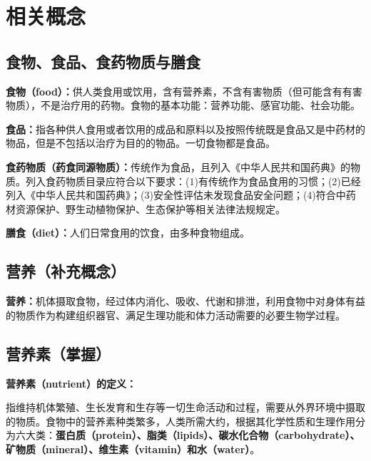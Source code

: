 \section{相关概念}

\subsection{食物、食品、食药物质与膳食}

\begin{defbox}
\textbf{食物（food）：}供人类食用或饮用，含有营养素，不含有害物质（但可能含有有害物质），不是治疗用的药物。食物的基本功能：营养功能、感官功能、社会功能。

\textbf{食品：}指各种供人食用或者饮用的成品和原料以及按照传统既是食品又是中药材的物品，但是不包括以治疗为目的的物品。一切食物都是食品。

\textbf{食药物质（药食同源物质）：}传统作为食品，且列入《中华人民共和国药典》的物质。列入食药物质目录应符合以下要求：(1)有传统作为食品食用的习惯；(2)已经列入《中华人民共和国药典》；(3)安全性评估未发现食品安全问题；(4)符合中药材资源保护、野生动植物保护、生态保护等相关法律法规规定。

\textbf{膳食（diet）：}人们日常食用的饮食，由多种食物组成。
\end{defbox}

\subsection{营养（补充概念）}

\begin{defbox}
\textbf{营养：}机体摄取食物，经过体内消化、吸收、代谢和排泄，利用食物中对身体有益的物质作为构建组织器官、满足生理功能和体力活动需要的必要生物学过程。
\end{defbox}

\subsection{营养素（掌握）}

\begin{keybox}
\textbf{营养素（nutrient）的定义：}

指维持机体繁殖、生长发育和生存等一切生命活动和过程，需要从外界环境中摄取的物质。食物中的营养素种类繁多，人类所需大约，根据其化学性质和生理作用分为六大类：\textbf{蛋白质（protein）、脂类（lipids）、碳水化合物（carbohydrate）、矿物质（mineral）、维生素（vitamin）和水（water）}。
\end{keybox}


